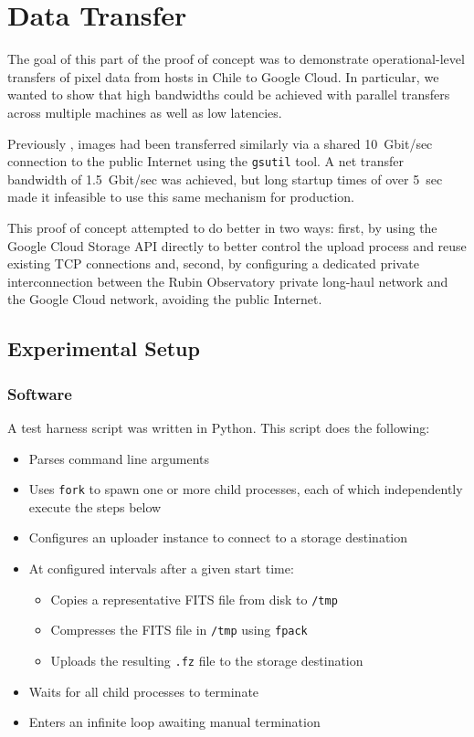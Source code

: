 \section{Data Transfer}\label{sec:dataxfer}

The goal of this part of the proof of concept was to demonstrate operational-level transfers of pixel data from hosts in Chile to Google Cloud.
In particular, we wanted to show that high bandwidths could be achieved with parallel transfers across multiple machines as well as low latencies.

Previously , images had been transferred similarly via a shared 10~Gbit/sec connection to the public Internet using the \texttt{gsutil} tool.
A net transfer bandwidth of 1.5~Gbit/sec was achieved, but long startup times of over 5~sec made it infeasible to use this same mechanism for production.

This proof of concept attempted to do better in two ways: first, by using the Google Cloud Storage API directly to better control the upload process and reuse existing TCP connections and, second, by configuring a dedicated private interconnection between the Rubin Observatory private long-haul network and the Google Cloud network, avoiding the public Internet.

\subsection{Experimental Setup}

\subsubsection{Software}

A test harness script was written in Python.
This script does the following:
\begin{itemize}
\item Parses command line arguments
\item Uses \texttt{fork} to spawn one or more child processes, each of which independently execute the steps below
\item Configures an uploader instance to connect to a storage destination
\item At configured intervals after a given start time:
  \begin{itemize}
  \item Copies a representative FITS file from disk to \texttt{/tmp}
  \item Compresses the FITS file in \texttt{/tmp} using \texttt{fpack}
  \item Uploads the resulting \texttt{.fz} file to the storage destination
  \end{itemize}
\item Waits for all child processes to terminate
\item Enters an infinite loop awaiting manual termination
\end{itemize}

